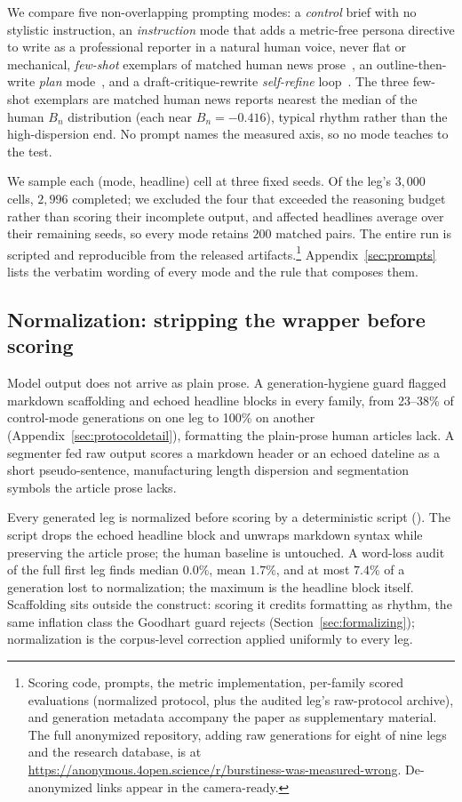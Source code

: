 \documentclass{article}
\begin{document}
We compare five non-overlapping prompting modes: a \emph{control} brief with
no stylistic instruction, an \emph{instruction} mode that adds a metric-free
persona directive to write as a professional reporter in a natural human
voice, never flat or mechanical,
\emph{few-shot} exemplars of matched human news
prose~\citep{brown2020language, min2022rethinking}, an outline-then-write
\emph{plan} mode~\citep{wang2023plan}, and a draft-critique-rewrite
\emph{self-refine} loop~\citep{madaan2023self}. The three few-shot exemplars
are matched human news reports nearest the median of the human $B_n$
distribution (each near $B_n = -0.416$), typical rhythm rather than the
high-dispersion end. No prompt names the measured axis, so no mode teaches to
the test.

We sample each (mode, headline) cell at three fixed seeds. Of the leg's
$3{,}000$ cells, $2{,}996$ completed; we excluded the four that exceeded the
reasoning budget rather than scoring their incomplete output, and affected
headlines average over their remaining seeds, so every mode retains $200$
matched pairs. The entire run is scripted and reproducible from the released
artifacts.\footnote{Scoring code, prompts, the metric implementation, per-family scored evaluations (normalized protocol, plus the audited leg's raw-protocol archive), and generation metadata accompany the paper as supplementary material. The full anonymized repository, adding raw generations for eight of nine legs and the research database, is at \url{https://anonymous.4open.science/r/burstiness-was-measured-wrong}. De-anonymized links appear in the camera-ready.}
Appendix~\ref{sec:prompts} lists the verbatim wording of every mode and the
rule that composes them.

\subsection{Normalization: stripping the wrapper before scoring}
\label{sec:normalization}
Model output does not arrive as plain prose. A generation-hygiene guard
flagged markdown scaffolding and echoed headline blocks in every family, from
23--38\% of control-mode generations on one leg to 100\% on another
(Appendix~\ref{sec:protocoldetail}), formatting the plain-prose human
articles lack. A segmenter fed raw
output scores a markdown header or an echoed dateline as a short
pseudo-sentence, manufacturing length dispersion and segmentation
symbols the article prose lacks.

Every generated leg is normalized before scoring by a deterministic script
(). The script drops the
echoed headline block and unwraps markdown syntax while preserving the
article prose; the human baseline is untouched. A word-loss audit of the full
first leg finds median $0.0\%$, mean $1.7\%$, and at most $7.4\%$ of a
generation lost to normalization; the maximum is the headline block itself. Scaffolding sits outside the construct: scoring it credits formatting
as rhythm, the same inflation class the Goodhart guard rejects
(Section~\ref{sec:formalizing}); normalization is the corpus-level
correction applied uniformly to every leg.
\end{document}
